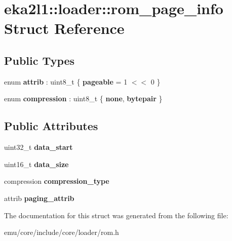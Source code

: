 \hypertarget{structeka2l1_1_1loader_1_1rom__page__info}{}\section{eka2l1\+:\+:loader\+:\+:rom\+\_\+page\+\_\+info Struct Reference}
\label{structeka2l1_1_1loader_1_1rom__page__info}
\subsection*{Public Types}
\begin{DoxyCompactItemize}
\item 
\mbox{\label{structeka2l1_1_1loader_1_1rom__page__info_adb684093cf6347b89ad4cf30ea6e5515}} 
enum {\bfseries attrib} \+: uint8\+\_\+t \{ {\bfseries pageable} = 1 $<$$<$ 0
 \}
\item 
\mbox{\label{structeka2l1_1_1loader_1_1rom__page__info_a31dda3f1bae7e6489e84f1ae52c8e2bc}} 
enum {\bfseries compression} \+: uint8\+\_\+t \{ {\bfseries none}, 
{\bfseries bytepair}
 \}
\end{DoxyCompactItemize}
\subsection*{Public Attributes}
\begin{DoxyCompactItemize}
\item 
\mbox{\label{structeka2l1_1_1loader_1_1rom__page__info_a5b6c98b4de8efd50dcacf37c0479f0e8}} 
uint32\+\_\+t {\bfseries data\+\_\+start}
\item 
\mbox{\label{structeka2l1_1_1loader_1_1rom__page__info_aea008a4ee26d6ee646adac367eb28e78}} 
uint16\+\_\+t {\bfseries data\+\_\+size}
\item 
\mbox{\label{structeka2l1_1_1loader_1_1rom__page__info_ad14d70d2f0880351568a48bcc44975ce}} 
compression {\bfseries compression\+\_\+type}
\item 
\mbox{\label{structeka2l1_1_1loader_1_1rom__page__info_a26a30f30d96e97c3233e7cb76b457864}} 
attrib {\bfseries paging\+\_\+attrib}
\end{DoxyCompactItemize}


The documentation for this struct was generated from the following file\+:\begin{DoxyCompactItemize}
\item 
emu/core/include/core/loader/rom.\+h\end{DoxyCompactItemize}
